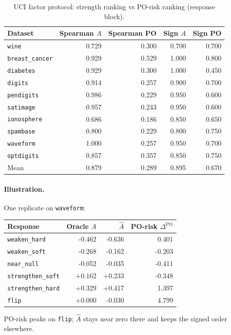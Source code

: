 \documentclass[11pt]{article}
\begin{document}
\begin{table}[h]
\centering
\caption{UCI factor protocol: strength ranking vs PO-risk ranking (response block).}
\label{tab:dss-po}
\begin{tabular}{lrrrr}
\toprule
Dataset & Spearman $A$ & Spearman PO & Sign $A$ & Sign PO \\
\midrule
\texttt{wine} & 0.729 & 0.300 & 0.700 & 0.700 \\
\texttt{breast\_cancer} & 0.929 & 0.529 & 1.000 & 0.800 \\
\texttt{diabetes} & 0.929 & 0.300 & 1.000 & 0.450 \\
\texttt{digits} & 0.914 & 0.257 & 0.900 & 0.700 \\
\texttt{pendigits} & 0.986 & 0.229 & 0.950 & 0.600 \\
\texttt{satimage} & 0.957 & 0.243 & 0.950 & 0.600 \\
\texttt{ionosphere} & 0.686 & 0.186 & 0.850 & 0.650 \\
\texttt{spambase} & 0.800 & 0.229 & 0.800 & 0.750 \\
\texttt{waveform} & 1.000 & 0.257 & 0.950 & 0.700 \\
\texttt{optdigits} & 0.857 & 0.357 & 0.850 & 0.750 \\
\midrule
Mean & 0.879 & 0.289 & 0.895 & 0.670 \\
\bottomrule
\end{tabular}
\end{table}

\paragraph{Illustration.}
One replicate on \texttt{waveform}:
\begin{center}
\begin{tabular}{lrrr}
\toprule
Response & Oracle $A$ & $\widehat A$ & PO-risk $\Delta^{\mathrm{PO}}$ \\
\midrule
\texttt{weaken\_hard} & -0.462 & -0.636 & 0.401 \\
\texttt{weaken\_soft} & -0.268 & -0.162 & -0.203 \\
\texttt{near\_null} & -0.052 & -0.035 & -0.411 \\
\texttt{strengthen\_soft} & +0.162 & +0.233 & -0.348 \\
\texttt{strengthen\_hard} & +0.329 & +0.417 & 1.397 \\
\texttt{flip} & +0.000 & -0.030 & 4.799 \\
\bottomrule
\end{tabular}
\end{center}
PO-risk peaks on \texttt{flip}; $\widehat A$ stays near zero there and keeps the signed order elsewhere.
\end{document}
